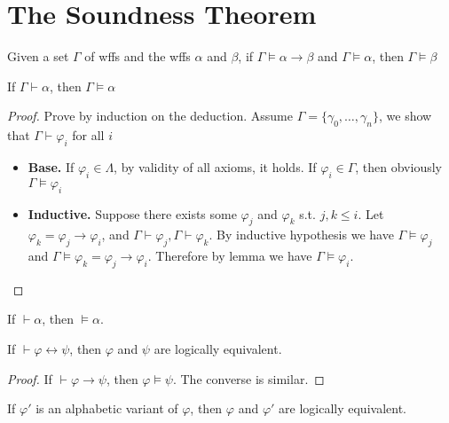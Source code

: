 \section{The Soundness Theorem}

\begin{lemma}
    Given a set $\Gamma$ of wffs and the wffs $\alpha$ and $\beta$, if $\Gamma\vDash\alpha\to\beta$ and $\Gamma\vDash\alpha$, then $\Gamma\vDash\beta$
\end{lemma}

\begin{theorem}
    \label{thm:SoundnessTheorem}
    If $\Gamma\vdash\alpha$, then $\Gamma\vDash\alpha$
\end{theorem}
\begin{proof}
    Prove by induction on the deduction. Assume $\Gamma=\{ \gamma_0,\dots,\gamma_n \}$, we show that $\Gamma\vdash\varphi_i$ for all $i$
    \begin{itemize}
        \item[] \textbf{Base.} If $\varphi_i \in \Lambda$, by validity of all axioms, it holds. If $\varphi_i \in \Gamma$, then obviously $\Gamma\vDash\varphi_i$
        \item[] \textbf{Inductive.} Suppose there exists some $\varphi_j$ and $\varphi_k$ s.t. $j,k \le i$. Let $\varphi_k = \varphi_j \to \varphi_i$, and $\Gamma\vdash\varphi_j, \Gamma\vdash\varphi_k$. By inductive hypothesis we have $\Gamma\vDash\varphi_j$ and $\Gamma\vDash\varphi_k=\varphi_j\to\varphi_i$. Therefore by lemma we have $\Gamma\vDash\varphi_i$. 
    \end{itemize}
\end{proof}

\begin{corollary}
    If $\vdash\alpha$, then $\vDash\alpha$.
\end{corollary}

\begin{corollary}
    If $\vdash\varphi\leftrightarrow\psi$, then $\varphi$ and $\psi$ are logically equivalent.
\end{corollary}
\begin{proof}
    If $\vdash\varphi\rightarrow\psi$, then $\varphi\vDash\psi$. The converse is similar.
\end{proof}

\begin{corollary}
    If $\varphi'$ is an alphabetic variant of $\varphi$, then $\varphi$ and $\varphi'$ are logically equivalent.
\end{corollary}


